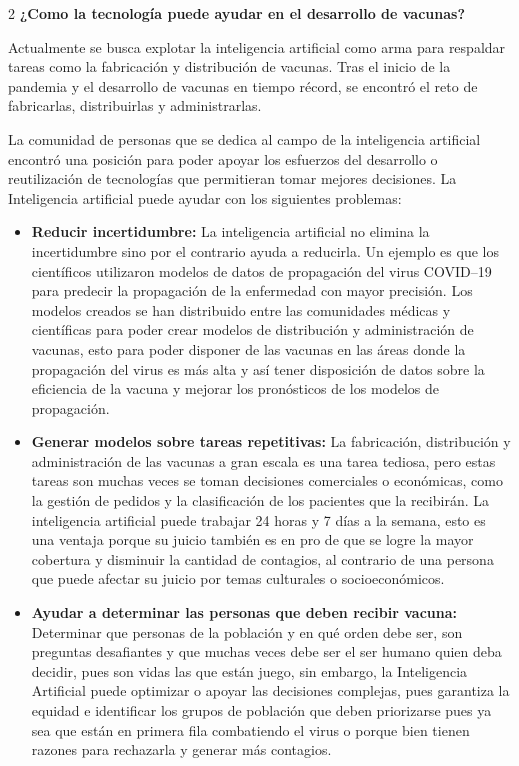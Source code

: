 \documentclass[12pt,spanish,Letterpaper,openany]{book}
\begin{document}
\begin {multicols}{2}
\textbf{¿Como la tecnología puede ayudar en el desarrollo de vacunas?}

Actualmente se busca explotar la inteligencia artificial como arma para respaldar tareas como
la fabricación y distribución de vacunas. Tras el inicio de la pandemia y el desarrollo de
vacunas en tiempo récord, se encontró el reto de fabricarlas, distribuirlas y administrarlas.

La comunidad de personas que se dedica al campo de la inteligencia artificial encontró una
posición para poder apoyar los esfuerzos del desarrollo o reutilización de tecnologías que
permitieran tomar mejores decisiones. La Inteligencia artificial puede ayudar con los
siguientes problemas:

\begin{itemize}
\item
  \textbf{Reducir incertidumbre:} La inteligencia artificial no elimina la incertidumbre sino por
  el contrario ayuda a reducirla. Un ejemplo es que los científicos utilizaron modelos
  de datos de propagación del virus COVID--19 para predecir la propagación de la
  enfermedad con mayor precisión. Los modelos creados se han distribuido entre las
  comunidades médicas y científicas para poder crear modelos de distribución y
  administración de vacunas, esto para poder disponer de las vacunas en las áreas donde
  la propagación del virus es más alta y así tener disposición de datos sobre la eficiencia
  de la vacuna y mejorar los pronósticos de los modelos de propagación.
\item
  \textbf{Generar modelos sobre tareas repetitivas:} La fabricación, distribución y
  administración de las vacunas a gran escala es una tarea tediosa, pero estas tareas son
  muchas veces se toman decisiones comerciales o económicas, como la gestión de
  pedidos y la clasificación de los pacientes que la recibirán. La inteligencia artificial
  puede trabajar 24 horas y 7 días a la semana, esto es una ventaja porque su juicio
  también es en pro de que se logre la mayor cobertura y disminuir la cantidad de
  contagios, al contrario de una persona que puede afectar su juicio por temas culturales
  o socioeconómicos.
\item
  \textbf{Ayudar a determinar las personas que deben recibir vacuna:} Determinar que personas
  de la población y en qué orden debe ser, son preguntas desafiantes y que muchas
  veces debe ser el ser humano quien deba decidir, pues son vidas las que están juego,
  sin embargo, la Inteligencia Artificial puede optimizar o apoyar las decisiones
  complejas, pues garantiza la equidad e identificar los grupos de población que deben
  priorizarse pues ya sea que están en primera fila combatiendo el virus o porque bien
  tienen razones para rechazarla y generar más contagios.
\end{itemize}


\end{multicols}
\end{document}
